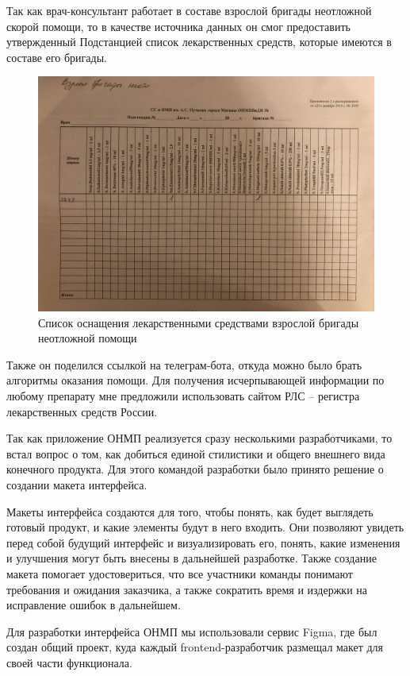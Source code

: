Так как врач-консультант работает в составе взрослой бригады неотложной скорой помощи, то в качестве источника данных он смог предоставить утвержденный Подстанцией список лекарственных средств, которые имеются в составе его бригады.

\begin{figure}
  \includegraphics[scale=0.35]{inc/список оснащения бригады.jpg}
  \caption{Список оснащения лекарственными средствами взрослой бригады неотложной помощи}
  \label{fig:fig02}
\end{figure}

Также он поделился ссылкой на телеграм-бота, откуда можно было брать алгоритмы оказания помощи. Для получения исчерпывающей информации по любому препарату мне предложили использовать сайтом РЛС -- регистра лекарственных средств России.

Так как приложение ОНМП реализуется сразу несколькими разработчиками, то встал вопрос о том, как добиться единой стилистики и общего внешнего вида конечного продукта. Для этого командой разработки было принято решение о создании макета интерфейса.

Макеты интерфейса создаются для того, чтобы понять, как будет выглядеть готовый продукт, и какие элементы будут в него входить. Они позволяют увидеть перед собой будущий интерфейс и визуализировать его, понять, какие изменения и улучшения могут быть внесены в дальнейшей разработке. Также создание макета помогает удостовериться, что все участники команды понимают требования и ожидания заказчика, а также сократить время и издержки на исправление ошибок в дальнейшем.

Для разработки интерфейса ОНМП мы использовали сервис Figma, где был создан общий проект, куда каждый frontend-разработчик размещал макет для своей части функционала. 

